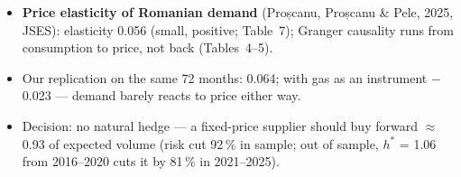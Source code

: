 \begin{itemize}\setlength{\itemsep}{2pt}
  \item \textbf{Price elasticity of Romanian demand} (Proșcanu, Proșcanu \& Pele, 2025, JSES): elasticity 0.056 (small, positive; Table~7); Granger causality runs from consumption to price, not back (Tables~4--5).
  \item Our replication on the same 72 months: 0.064; with gas as an instrument $-$0.023 --- demand barely reacts to price either way.
  \item Decision: no natural hedge --- a fixed-price supplier should buy forward $\approx$0.93 of expected volume (risk cut 92\,\% in sample; out of sample, $h^*$ = 1.06 from 2016--2020 cuts it by 81\,\% in 2021--2025).
\end{itemize}
